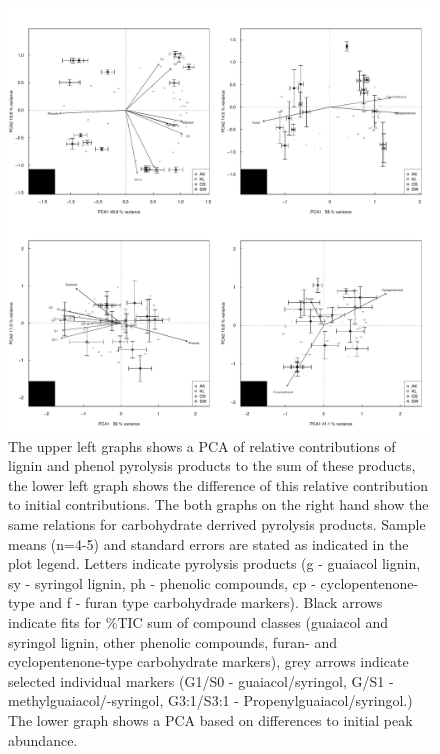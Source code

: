 \documentclass[preprint,review,12pt]{elsarticle}
\begin{document}
\newpage
\begin{figure}[h!]
\begin{center}
\includegraphics{pyrpaper-pcalph}
\end{center}
\caption{The upper left graphs shows a PCA of relative contributions of lignin and phenol pyrolysis products to the sum of these products, the lower left graph shows the difference of this relative contribution to initial contributions. The both graphs on the right hand show the same relations for carbohydrate derrived pyrolysis products. Sample means (n=4-5) and standard errors are stated as indicated in the plot legend. Letters indicate pyrolysis products (g - guaiacol lignin, sy - syringol lignin, ph - phenolic compounds, cp - cyclopentenone-type and f - furan type carbohydrade markers). Black arrows indicate fits for \%TIC sum of compound classes (guaiacol and syringol lignin, other phenolic compounds, furan- and cyclopentenone-type carbohydrate markers), grey arrows indicate selected individual markers (G1/S0 - guaiacol/syringol, G/S1 - methylguaiacol/-syringol, G3:1/S3:1 - Propenylguaiacol/syringol.) The lower graph shows a PCA based on  differences to initial peak abundance.}
\label{fig:pcalph}
\end{figure}
\end{document}
